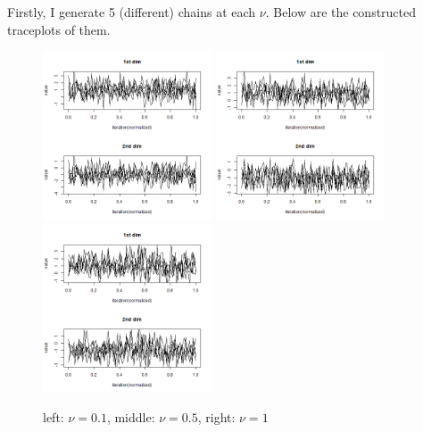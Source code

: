 \documentclass{article}
\begin{document}
Firstly, I generate 5 (different) chains at each $\nu$. Below are the constructed traceplots of them.
\begin{figure}[!h]
    \centering
    \includegraphics[height=5cm]{prob1_test3_many_process_traceplot.png}
    \includegraphics[height=5cm]{prob1_test2_many_process_traceplot.png}
    \includegraphics[height=5cm]{prob1_test4_many_process_traceplot.png}
    \caption{left: $\nu=0.1$, middle: $\nu=0.5$, right: $\nu=1$}
\end{figure}
\end{document}

